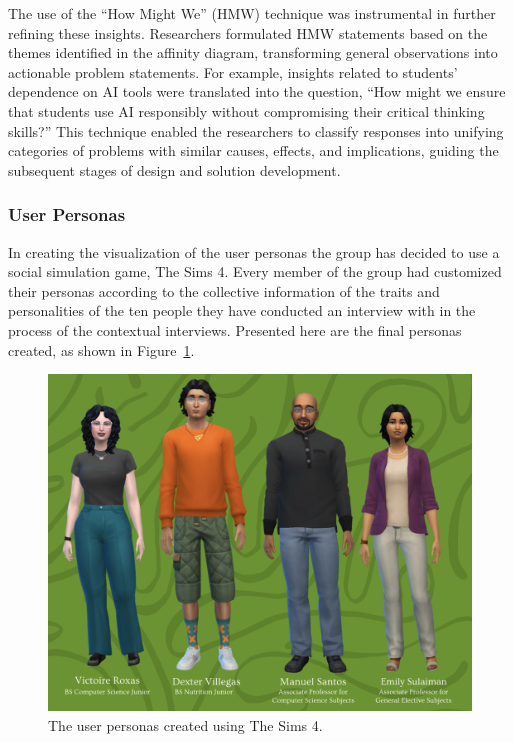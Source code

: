 \documentclass[sigconf,natbib=true]{acmart}
\begin{document}
The use of the “How Might We” (HMW) technique was instrumental in further refining these insights. Researchers formulated HMW statements based on the themes identified in the affinity diagram, transforming general observations into actionable problem statements. For example, insights related to students’ dependence on AI tools were translated into the question, “How might we ensure that students use AI responsibly without compromising their critical thinking skills?” This technique enabled the researchers to classify responses into unifying categories of problems with similar causes, effects, and implications, guiding the subsequent stages of design and solution development.

\subsubsection{User Personas}
In creating the visualization of the user personas the group has decided to use a social simulation game, The Sims 4. Every member of the group had customized their personas according to the collective information of the traits and personalities of the ten people they have conducted an interview with in the process of the contextual interviews. Presented here are the final personas created, as shown in Figure~\ref{fig:personas}.

\begin{figure}[h]
  \centering
  \includegraphics[width=\linewidth]{user_personas.png}
  \caption{The user personas created using The Sims 4.}\label{fig:personas}
\end{figure}
\end{document}
